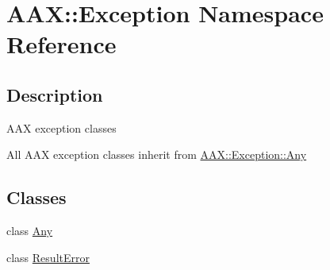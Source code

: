 \hypertarget{a00320}{}\section{A\+A\+X\+:\+:Exception Namespace Reference}
\label{a00320}


\subsection{Description}
A\+A\+X exception classes 

All A\+A\+X exception classes inherit from \hyperlink{a00143}{A\+A\+X\+::\+Exception\+::\+Any} \subsection*{Classes}
\begin{DoxyCompactItemize}
\item 
class \hyperlink{a00143}{Any}
\item 
class \hyperlink{a00147}{Result\+Error}
\end{DoxyCompactItemize}
